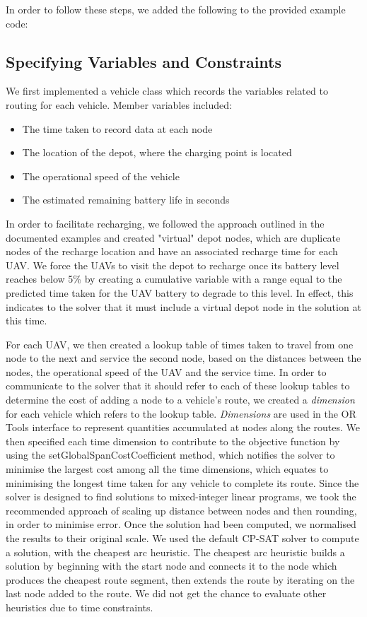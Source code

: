 In order to follow these steps, we added the following to the provided example code:

\subsection{Specifying Variables and Constraints}
We first implemented a vehicle class which records the variables related to routing for each vehicle. Member variables included:
\begin{itemize}
    \item The time taken to record data at each node
    \item The location of the depot, where the charging point is located
    \item The operational speed of the vehicle
    \item The estimated remaining battery life in seconds
\end{itemize}
In order to facilitate recharging, we followed the approach outlined in the documented examples and created "virtual" depot nodes, which are duplicate nodes of the recharge location and have an associated recharge time for each UAV.  We force the UAVs to visit the depot to recharge once its battery level reaches below 5\% by creating a cumulative variable with a range equal to the predicted time taken for the UAV battery to degrade to this level. In effect, this indicates to the solver that it must include a virtual depot node in the solution at this time.

For each UAV, we then created a lookup table of times taken to travel from one node to the next and service the second node, based on the distances between the nodes, the operational speed of the UAV and the service time. In order to communicate to the solver that it should refer to each of these lookup tables to determine the cost of adding a node to a vehicle's route, we created a \textit{dimension} for each vehicle which refers to the lookup table. \textit{Dimensions} are used in the OR Tools interface to represent quantities accumulated at nodes along the routes. We then specified each time dimension to contribute to the objective function by using the setGlobalSpanCostCoefficient method, which notifies the solver to minimise the largest cost among all the time dimensions, which equates to minimising the longest time taken for any vehicle to complete its route. Since the solver is designed to find solutions to mixed-integer linear programs, we took the recommended approach of scaling up distance between nodes and then rounding, in order to minimise error. Once the solution had been computed, we normalised the results to their original scale. We used the default CP-SAT solver to compute a solution, with the cheapest arc heuristic. The cheapest arc heuristic builds a solution by beginning with the start node and connects it to the node which produces the cheapest route segment, then extends the route by iterating on the last node added to the route. We did not get the chance to evaluate other heuristics due to time constraints.

